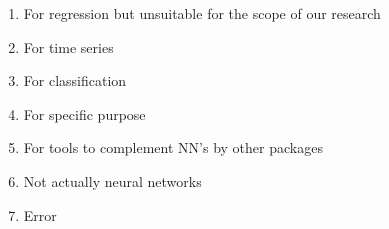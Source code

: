 \begin{enumerate}
\def\labelenumi{\arabic{enumi}.}
\tightlist
\item
  For regression but unsuitable for the scope of our research
\item
  For time series
\item
  For classification
\item
  For specific purpose
\item
  For tools to complement NN's by other packages
\item
  Not actually neural networks
\item
  Error
\end{enumerate}

\begin{Schunk}
\begingroup\fontsize{7}{9}\selectfont


\end{Schunk}
